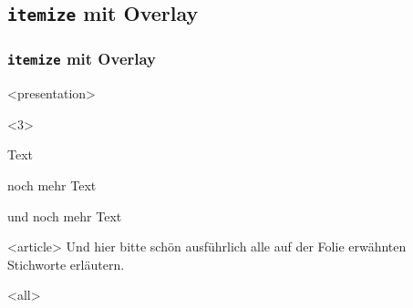 \subsection{\texttt{itemize} mit Overlay}

\begin{frame}[fragile]
\frametitle<presentation>{\texttt{itemize} mit Overlay}


\mode
<presentation>
\begin{oitemize}<3>
 \item Text
 \item noch mehr Text
 \item und noch mehr Text
\end{oitemize}


\mode
<article>
Und hier bitte schön ausführlich alle auf der Folie erwähnten Stichworte erläutern.



\mode
<all>

\end{frame}
\newpage
\clearpage